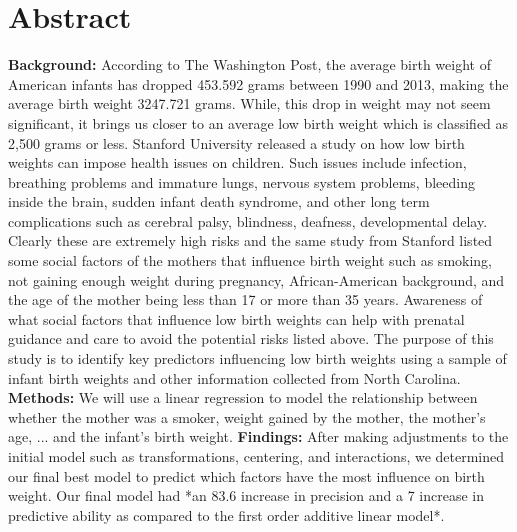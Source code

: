 \documentclass{article}\usepackage[]{graphicx}\usepackage[]{xcolor}
\begin{document}
\section{\textbf{Abstract}}
\textbf{Background:} According to The Washington Post, the average birth weight of American infants has dropped 453.592 grams between 1990 and 2013, making the average birth weight 3247.721 grams. While, this drop in weight may not seem significant, it brings us closer to an average low birth weight which is classified as 2,500 grams or less. Stanford University released a study on how low birth weights can impose health issues on children. Such issues include infection, breathing problems and immature lungs, nervous system problems, bleeding inside the brain, sudden infant death syndrome, and other long term complications such as cerebral palsy, blindness, deafness, developmental delay. Clearly these are extremely high risks and the same study from Stanford listed some social factors of the mothers that influence birth weight such as smoking, 
not gaining enough weight during pregnancy, African-American background,  and the age of the mother being less than 17 or more than 35 years. Awareness of what social factors that influence low birth weights can help with prenatal guidance and care to avoid the potential risks listed above. The purpose of this study is to identify key predictors influencing low birth weights using a sample of infant birth weights and other information collected from North Carolina. \textbf{Methods:} We will use a linear regression to model the relationship between whether the mother was a smoker, weight gained by the mother, the mother's age, ... and the infant's birth weight. \textbf{Findings:} After making adjustments to the initial model such as transformations, centering,  and interactions, we determined our final best model to predict which factors have the most influence on birth weight. Our final model had *an 83.6 increase in precision and a 7 increase in predictive ability as compared to the first order additive linear model*.
\end{document}
